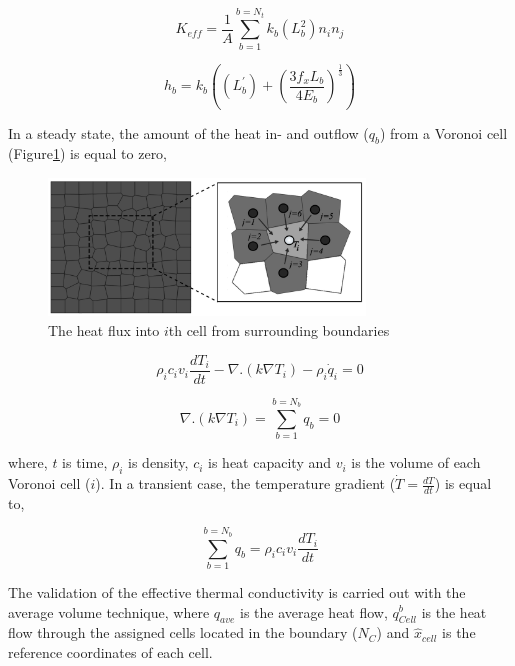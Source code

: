 \begin{equation}
\label{eq:LEM_Thermal_1}
K_{eff}=\frac{1}{A}\sum_{b=1}^{b=N_t}{k_b(L_b^2)n_i n_j}
\end{equation}

\begin{equation}
\label{eq:LEM_Thermal_2}
h_b = k_{b} \left( (L_b^\prime)+ \left(\frac{3f_x L_b}{4E_b}\right)^\frac{1}{3} \right)
\end{equation}

In a steady state, the amount of the heat in- and outflow ($q_b$) from a Voronoi cell (Figure\ref{fig:Amir_LEM_Thermal}) is equal to zero,

\begin{figure}[!ht]
\centering
\includegraphics[width=0.75\textwidth]{figures/Amir_LEM_Thermal.png}
\caption{The heat flux into $i$th cell from surrounding boundaries}
\label{fig:Amir_LEM_Thermal}
\end{figure}


\begin{equation}
\label{eq:LEM_Thermal_3}
\rho_{i}c_{i}v_{i}\frac{dT_{i}}{dt}-\nabla .\left(k\nabla T_i\right)-\rho_i{\dot{q}}_i=0
\end{equation}

\begin{equation}
\label{eq:LEM_Thermal_4}
\nabla .\left(k\nabla T_i\right)=\sum_{b=1}^{b=N_b}{q_b=0}
\end{equation}

 
where, $t$ is time, $\rho_{i}$ is density, $c_{i}$ is heat capacity and $v_{i}$ is the volume of each Voronoi cell ($i$). In a transient case, the temperature gradient ($\dot{T}=\frac{dT}{dt}$) is equal to,

\begin{equation}
\label{eq:LEM_Thermal_5}
\sum_{b=1}^{b=N_b}{q_b=}\rho_{i}c_{i}v_{i}\frac{dT_i}{dt}
\end{equation}

The validation of the effective thermal conductivity is carried out with the average volume technique, where $q_{ave}$ is the average heat flow, $q_{Cell}^{b}$ is the heat flow through the assigned cells located in the boundary ($N_C$) and  $\hat{x}_{cell}$ is the reference coordinates of each cell.

